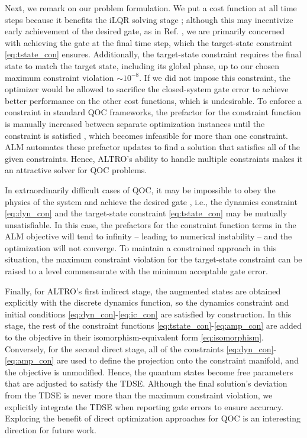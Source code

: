 Next, we remark on our problem formulation.
We put a cost function at all time steps
because it benefits the iLQR solving stage \cite{Jackson2020altroc};
although this may incentivize early achievement of the desired gate,
as in Ref. \cite{leung2017speedup}, we are primarily concerned
with achieving the gate at the final time step, which the target-state
constraint \eqref{eq:tstate_con} ensures.
Additionally, the target-state constraint
requires the final state to match the target state, including its global phase,
up to our chosen maximum constraint violation $\sim 10^{-8}$.
If we did not impose this constraint, the optimizer would be
allowed to sacrifice the closed-system gate error to achieve better
performance on the other cost functions, which is undesirable.
To enforce a constraint in standard QOC frameworks,
the prefactor for the constraint function is manually increased
between separate optimization instances until the constraint is satisfied
\cite{heeres2017implementing, leung2017speedup, reinhold2019controlling},
which becomes infeasible for more than one constraint.
ALM automates these prefactor updates to find
a solution that satisfies all of the given constraints.
Hence, ALTRO's ability to handle multiple constraints makes it
an attractive solver for QOC problems.

In extraordinarily difficult cases of
QOC, it may be impossible
to obey the physics of the system and achieve the desired gate \cite{abdelhafez2020universal},
i.e., the dynamics constraint \eqref{eq:dyn_con}
and the target-state constraint \eqref{eq:tstate_con} may be mutually unsatisfiable.
In this case, the prefactors for the constraint function terms
in the ALM objective will tend to infinity -- leading to numerical instability -- and the
optimization will not converge. To maintain a constrained approach in this situation,
the maximum constraint violation for the target-state constraint can be raised
to a level commensurate with the minimum acceptable gate error.

Finally, for ALTRO's first indirect stage,
the augmented states are obtained explicitly with the discrete
dynamics function, so the dynamics constraint and initial conditions
\eqref{eq:dyn_con}-\eqref{eq:ic_con} are satisfied by construction.
In this stage, the rest of the constraint functions \eqref{eq:tstate_con}-\eqref{eq:amp_con}
are added to the objective in their isomorphism-equivalent form \eqref{eq:isomorphism}.
Conversely, for the second direct stage, all of the constraints
\eqref{eq:dyn_con}-\eqref{eq:amp_con} are used to define
the projection onto the constraint manifold, and the objective is unmodified.
Hence, the quantum states become
free parameters that are adjusted to satisfy the TDSE.
Although the final solution's deviation from the TDSE is never
more than the maximum constraint violation,
we explicitly integrate the TDSE when reporting gate errors to ensure accuracy.
Exploring the benefit of direct optimization approaches
for QOC is an interesting direction for future work.
